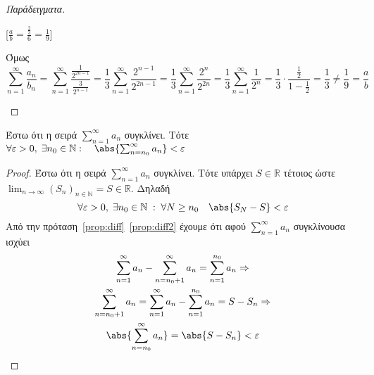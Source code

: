 \documentclass[main.tex]{subfiles}
\begin{document}
\begin{rem}
\begin{proof}[Παράδειγματα]
\begin{enumerate}[i)]
                [$ \frac{a}{b} = \frac{\frac{2}{3}}{6} = \frac{1}{9} $]

                Όμως 
                \[
                    \sum_{n=1}^{\infty} \frac{a_{n}}{b_{n}} = \sum_{n=1}^{\infty} 
                    \frac{\frac{1}{2^{2n-1}}}{\frac{3}{2^{n-1}}} = 
                    \frac{1}{3} \sum_{n=1}^{\infty} \frac{2^{n-1}}{2^{2n-1}} = 
                    \frac{1}{3} \sum_{n=1}^{\infty} \frac{2^{n}}{2^{2n}} = 
                    \frac{1}{3} \sum_{n=1}^{\infty} \frac{1}{2^{n}} = \frac{1}{3} \cdot 
                    \frac{\frac{1}{2}}{1 - \frac{1}{2}} = \frac{1}{3} \neq \frac{1}{9} 
                    = \frac{a}{b}
                \] 
        \end{enumerate}

    \end{proof}
\end{rem}

\begin{prop}
    Έστω ότι η σειρά $ \sum_{n=1}^{\infty} a_{n} $ συγκλίνει. Τότε 
    $ \forall \varepsilon >0, \; \exists n_{0} \in \mathbb{N} :
    \quad \abs{\sum_{n= n_{0}}^{\infty} a_{n}} < \varepsilon $
\end{prop}
\begin{proof}
\item {}
    Έστω ότι η σειρά $ \sum_{n=1}^{\infty} a_{n} $ συγκλίνει. Τότε υπάρχει 
    $ S \in \mathbb{R} $ τέτοιος ώστε $ \lim_{n \to \infty} 
    {(S_{n})}_{n \in \mathbb{N}} = S \in \mathbb{R} $. Δηλαδή 
    \[
        \forall \varepsilon >0, \; \exists n_{0} \in \mathbb{N} \; : \; 
        \forall N \geq n_{0} \quad \abs{S_{N}-S} < \varepsilon 
    \] 
    Από την πρόταση~\ref{prop:diff}~\ref{prop:diff2} έχουμε ότι αφού 
    $ \sum_{n=1}^{\infty} a_{n} $ συγκλίνουσα ισχύει
    \begin{gather*}
        \sum_{n=1}^{\infty} a_{n} - \sum_{n= n_{0}+1}^{\infty} a_{n} = 
        \sum_{n= 1}^{n_{0}} a_{n} \Rightarrow \\ 
        \sum_{n= n_{0}+1}^{\infty} a_{n} = \sum_{n=1}^{\infty} a_{n} - 
        \sum_{n=1}^{n_{0}} a_{n} = S - S_{n} \Rightarrow \\
        \abs{\sum_{n= n_{0}}^{\infty} a_{n}} = \abs{S - S_{n}} < \varepsilon
    \end{gather*} 
\end{proof}
\end{document}
